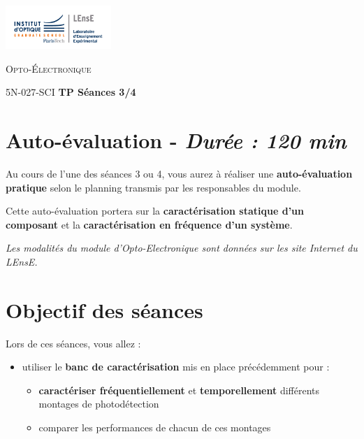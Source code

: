 \newpage

\begin{minipage}[c]{.25\linewidth}
	\includegraphics[width=4cm]{images/Logo-LEnsE.png}
\end{minipage} \hfill
\begin{minipage}[c]{.4\linewidth}

\begin{center}
\vspace{0.3cm}
{\Large \textsc{Opto-Électronique}}

\medskip

5N-027-SCI \qquad \textbf{\Large TP Séances 3/4}

\end{center}
\end{minipage}\hfill

\section{Auto-évaluation - \textit{Durée : 120 min}}

Au cours de l'une des séances 3 ou 4, vous aurez à réaliser une \textbf{auto-évaluation pratique} selon le planning transmis par les responsables du module.

Cette auto-évaluation portera sur la \textbf{caractérisation statique d'un  composant} et la \textbf{caractérisation en fréquence d'un système}.

\medskip

\textit{Les modalités du module d'Opto-Electronique sont données sur les site Internet du LEnsE.}

\section{Objectif des séances}

Lors de ces séances, vous allez :

\begin{itemize}
	\item utiliser le \textbf{banc de caractérisation} mis en place précédemment pour :
	\begin{itemize}
		\item  \textbf{caractériser fréquentiellement} et \textbf{temporellement} différents montages de photodétection
		\item comparer les performances de chacun de ces montages
	\end{itemize} 
\end{itemize} 




